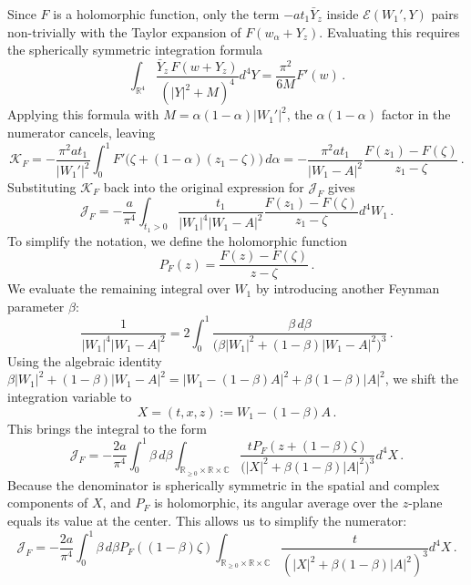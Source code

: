 \documentclass[11pt]{article}
\numberwithin{equation}{section}
\begin{document}
Since \(F\) is a holomorphic function, only the term $-a t_1 \bar Y_z$ inside \(\mathcal{E}(W_1',Y)\) pairs non-trivially with the Taylor expansion of \(F(w_\alpha+Y_z)\). Evaluating this requires the spherically symmetric integration formula
\begin{equation}
\int_{\mathbb R^4}
\frac{\bar{Y}_z\,F(w+Y_z)}{(|Y|^2+M)^4}d^4Y=  \frac{\pi^2}{6M}F'(w)\,.
\end{equation}
Applying this formula with $M = \alpha(1-\alpha)|W_1'|^2$, the $\alpha(1-\alpha)$ factor in the numerator cancels, leaving
\begin{equation}
\mathcal{K}_F = -\frac{\pi^2a t_1}{|W_1'|^2}
\int_0^1
F'\bigl(\zeta+(1-\alpha)(z_1-\zeta)\bigr)\,d\alpha  = -\frac{\pi^2a t_1}{|W_1-A|^2}
\frac{F(z_1)-F(\zeta)}{z_1-\zeta}\,.
\end{equation}
Substituting $\mathcal{K}_F$ back into the original expression for $\mathcal{J}_F$ gives
\begin{equation}
\mathcal{J}_F = -\frac{a}{\pi^4}\int_{t_1>0}\frac{t_1}{|W_1|^4|W_1-A|^2}\frac{F(z_1)-F(\zeta)}{z_1-\zeta}d^4W_1\,.
\end{equation}
To simplify the notation, we define the holomorphic function
\begin{equation}
P_F(z)=\frac{F(z)-F(\zeta)}{z-\zeta}\,.
\end{equation}
We evaluate the remaining integral over $W_1$ by introducing another Feynman parameter $\beta$:
\begin{equation} 
	\frac1{|W_1|^4|W_1-A|^2} = 2\int_0^1 \frac{\beta\,d\beta}{\bigl(\beta|W_1|^2+(1-\beta)|W_1-A|^2\bigr)^3}\,.
\end{equation}
Using the algebraic identity $\beta|W_1|^2+(1-\beta)|W_1-A|^2 = |W_1-(1-\beta)A|^2+\beta(1-\beta)|A|^2$, we shift the integration variable to
\begin{equation}
X = (t,x,z) := W_1-(1-\beta)A\,.
\end{equation}
This brings the integral to the form
\begin{equation}
\mathcal{J}_F = -\frac{2a}{\pi^4} \int_0^1\beta\,d\beta\int_{\mathbb{R}_{\geq0}\times \mathbb{R}\times \mathbb{C}} \frac{tP_F(z+(1-\beta)\zeta)}{\bigl(|X|^2+\beta(1-\beta)|A|^2\bigr)^3} d^4X\,.
\end{equation}
Because the denominator is spherically symmetric in the spatial and complex components of \(X\), and \(P_F\) is holomorphic, its angular average over the $z$-plane equals its value at the center. This allows us to simplify the numerator:
\begin{equation}
\mathcal{J}_F = -\frac{2a}{\pi^4} \int_0^1\beta\,d\beta P_F((1-\beta)\zeta) \int_{\mathbb{R}_{\geq0}\times \mathbb{R}\times \mathbb{C}} \frac{t}{(|X|^2+\beta(1-\beta)|A|^2)^3}d^4X\,.
\end{equation}
\end{document}
